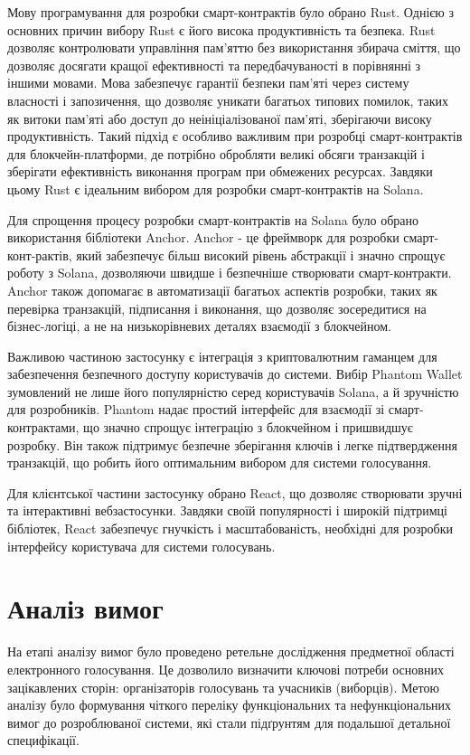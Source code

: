 \documentclass[14pt]{extreport}
\begin{document}
  Мову програмування для розробки смарт-контрактів було обрано Rust. Однією з основних причин вибору Rust є його висока продуктивність та безпека. Rust дозволяє контролювати управління пам'яттю без використання збирача сміття, що дозволяє досягати кращої ефективності та передбачуваності в порівнянні з іншими мовами. Мова забезпечує гарантії безпеки пам'яті через систему власності і запозичення, що дозволяє уникати багатьох типових помилок, таких як витоки пам'яті або доступ до неініціалізованої пам'яті, зберігаючи високу продуктивність. Такий підхід є особливо важливим при розробці смарт-контрактів для блокчейн-платформи, де потрібно обробляти великі обсяги транзакцій і зберігати ефективність виконання програм при обмежених ресурсах. Завдяки цьому Rust є ідеальним вибором для розробки смарт-контрактів на Solana.

  Для спрощення процесу розробки смарт-контрактів на Solana було обрано використання бібліотеки Anchor. Anchor - це фреймворк для розробки смарт-конт-рактів, який забезпечує більш високий рівень абстракції і значно спрощує роботу з Solana, дозволяючи швидше і безпечніше створювати смарт-контракти. Anchor також допомагає в автоматизації багатьох аспектів розробки, таких як перевірка транзакцій, підписання і виконання, що дозволяє зосередитися на бізнес-логіці, а не на низькорівневих деталях взаємодії з блокчейном.

  Важливою частиною застосунку є інтеграція з криптовалютним гаманцем для забезпечення безпечного доступу користувачів до системи. Вибір Phantom Wallet зумовлений не лише його популярністю серед користувачів Solana, а й зручністю для розробників. Phantom надає простий інтерфейс для взаємодії зі смарт-контрактами, що значно спрощує інтеграцію з блокчейном і пришвидшує розробку. Він також підтримує безпечне зберігання ключів і легке підтвердження транзакцій, що робить його оптимальним вибором для системи голосування.

  Для клієнтської частини застосунку обрано React, що дозволяє створювати зручні та інтерактивні вебзастосунки. Завдяки своїй популярності і широкій підтримці бібліотек, React забезпечує гнучкість і масштабованість, необхідні для розробки інтерфейсу користувача для системи голосувань.
  
  \section{Аналіз вимог}
  
  На етапі аналізу вимог було проведено ретельне дослідження предметної області електронного голосування. Це дозволило визначити ключові потреби основних зацікавлених сторін: організаторів голосувань та учасників (виборців). Метою аналізу було формування чіткого переліку функціональних та нефункціональних вимог до розроблюваної системи, які стали підґрунтям для подальшої детальної специфікації.
  
\end{document}
